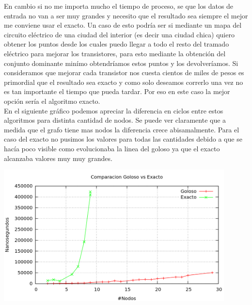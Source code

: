 En cambio si no me importa mucho el tiempo de proceso, se que los datos de entrada no van a ser muy grandes y necesito que el resultado sea siempre el mejor me conviene usar el exacto. Un caso de esto podría ser si mediante un mapa del circuito eléctrico de una ciudad del interior (es decir una ciudad chica) quiero obtener los puntos desde los cuales puedo llegar a todo el resto del tramado eléctrico para mejorar los transistores, para esto mediante la obtención del conjunto dominante minímo obtendríamos estos puntos y los devolveríamos. Si consideramos que mejorar cada transistor nos cuesta cientos de miles de pesos es primordial que el resultado sea exacto y como solo deseamos correrlo una vez no es tan importante el tiempo que pueda tardar. Por eso en este caso la mejor opción sería el algoritmo exacto. \\

En el siguiente gráfico podemos apreciar la diferencia en ciclos entre estos algoritmos para distinta cantidad de nodos. Se puede ver claramente que a medida que el grafo tiene mas nodos la diferencia crece abisamalmente. Para el caso del exacto no pusimos los valores para todas las cantidades debido a que se hacía poco visible como evolucionaba la linea del goloso ya que el exacto alcanzaba valores muy muy grandes. 
\begin{center}
  \includegraphics[width=12cm]{./graficos/comp_exacto_goloso.png}
\end{center}


